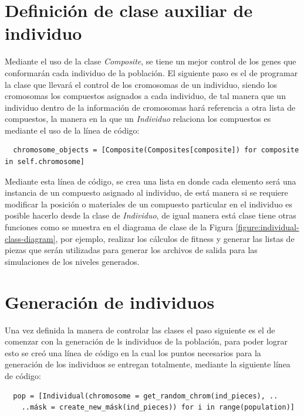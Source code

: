 \section{Definición de clase auxiliar de individuo}
\label{section:definition_of_clases}

Mediante el uso de la clase \textit{Composite}, se tiene un mejor control de los genes
que conformarán cada individuo de la población. El siguiente paso es el de 
programar la clase que llevará el control de los cromosomas de un individuo, 
siendo los cromosomas los compuestos asignados a cada individuo, de tal manera que un individuo
dentro de la información de cromosomas hará referencia a otra lista de
compuestos, la manera en la que un \textit{Individuo} relaciona los compuestos es
mediante el uso de la línea de código:

\begin{verbatim}
  chromosome_objects = [Composite(Composites[composite]) for composite in self.chromosome]
\end{verbatim}

Mediante esta línea de código, se crea una lista en donde
cada elemento será una instancia de un compuesto asignado al individuo, de está
manera si se requiere modificar la posición o materiales de un compuesto
particular en el individuo es posible hacerlo desde la clase de
\textit{Individuo}, de igual manera está clase tiene otras funciones 
como se muestra en el diagrama de clase de la Figura
\ref{figure:individual-class-diagram}, por ejemplo, realizar los cálculos de fitness y generar
las listas de piezas que serán utilizadas para generar los archivos de salida
para las simulaciones de los niveles generados.

\section{Generación de individuos}
\label{section:ind_generation}

Una vez definida la manera de controlar las clases el paso siguiente es el de
comenzar con la generación de ls individuos de la población, para poder lograr
esto se creó una línea de código en la cual los puntos necesarios para la
generación de los individuos se entregan totalmente, mediante la siguiente 
línea de código: 

\begin{verbatim}
  pop = [Individual(chromosome = get_random_chrom(ind_pieces), ..
    ..másk = create_new_másk(ind_pieces)) for i in range(population)]
\end{verbatim}

